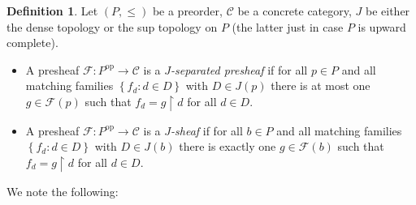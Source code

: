 \documentclass[11pt]{amsart}
\newcommand{\F}{\mathcal{F}}
\theoremstyle{plain}
\theoremstyle{definition}
\newtheorem{definition}[theorem]{Definition}
\theoremstyle{plain}
\theoremstyle{remark}
\newcommand{\bp}[1]{\left\lbrace #1 \right\rbrace}
\newcommand{\0}{\mathsf{0}}
\renewcommand{\1}{\mathsf{1}}
\renewcommand{\2}{\mathsf{2}}
\theoremstyle{definition}
\begin{document}
\begin{definition}\label{def:globgrtop}
Let $(P,\leq)$ be a preorder,  $\mathcal{C}$ be a concrete category, $J$ be either the dense topology or the sup topology on $P$ (the latter just in case $P$ is upward complete).
\begin{itemize}
\item A presheaf
$\F:P^\mathrm{op}\to\mathcal{C}$ is a \emph{$J$-separated presheaf} if for all $p\in P$ and  all matching families $\bp{f_d:d\in D}$ with $D\in J(p)$ there is at most one $g\in \F(p)$ such that $f_d=g\restriction d$ for all $d\in D$.
\item 
A presheaf $\F:P^\mathrm{op}\to\mathcal{C}$ is
a \emph{$J$-sheaf} if for all $b\in P$ and  all matching families $\bp{f_d:d\in D}$ with $D\in J(b)$ there is exactly one $g\in \F(b)$ such that $f_d=g\restriction d$ for all $d\in D$.
\end{itemize}
\end{definition}
We note the following:
\end{document}
